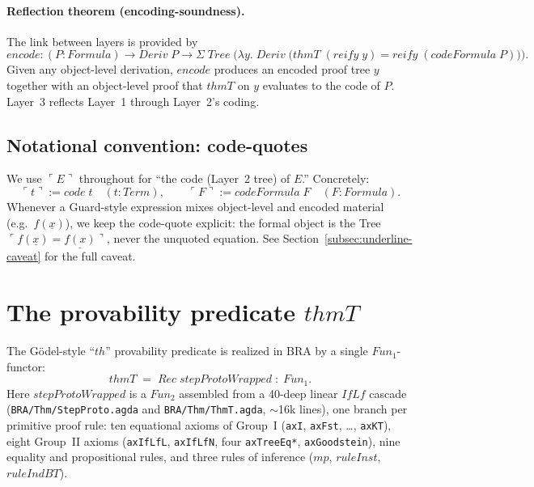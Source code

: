 \documentclass[11pt]{article}
\begin{document}
\paragraph{Reflection theorem (encoding-soundness).}
The link between layers is provided by
\[
  \mathit{encode} : (P : \mathit{Formula}) \to \mathit{Deriv}\;P \to
    \Sigma\;\mathit{Tree}\;\bigl(\lambda y.\;\mathit{Deriv}\;
      \bigl(\mathit{thmT}\;(\mathit{reify}\;y) =
            \mathit{reify}\;(\mathit{codeFormula}\;P)\bigr)\bigr).
\]
Given any object-level derivation, $\mathit{encode}$ produces an
encoded proof tree $y$ together with an object-level proof that
$\mathit{thmT}$ on $y$ evaluates to the code of $P$.  Layer~3 reflects
Layer~1 through Layer~2's coding.

\subsection{Notational convention: code-quotes}
\label{subsec:codequote}

We use $\ulcorner E \urcorner$ throughout for ``the code (Layer~2 tree) of
$E$.''  Concretely:
\[
  \ulcorner t \urcorner := \mathit{code}\;t \quad (t : \mathit{Term}), \qquad
  \ulcorner F \urcorner := \mathit{codeFormula}\;F \quad (F : \mathit{Formula}).
\]
Whenever a Guard-style expression mixes object-level and encoded
material (e.g.\ $f(\underline{x})$), we keep the code-quote explicit:
the formal object is the Tree $\ulcorner f(\underline{x}) =
\underline{f(x)}\urcorner$, never the unquoted equation.  See
Section~\ref{subsec:underline-caveat} for the full caveat.

\section{The provability predicate $\mathit{thmT}$}
\label{sec:thmT}

The G\"odel-style ``$\mathit{th}$'' provability predicate is realized in BRA by a single $\mathit{Fun}_1$-functor:
\[
  \mathit{thmT} \;=\; \mathit{Rec}\;\mathit{stepProtoWrapped} \;:\; \mathit{Fun}_1.
\]
Here $\mathit{stepProtoWrapped}$ is a $\mathit{Fun}_2$ assembled from a 40-deep linear $\mathit{IfLf}$ cascade
(\verb|BRA/Thm/StepProto.agda| and \verb|BRA/Thm/ThmT.agda|, $\sim$16k lines), one branch per primitive proof rule:
ten equational axioms of Group~I (\verb|axI|, \verb|axFst|, \dots, \verb|axKT|), eight Group~II axioms
(\verb|axIfLfL|, \verb|axIfLfN|, four \verb|axTreeEq*|, \verb|axGoodstein|), nine equality and propositional rules,
and three rules of inference ($\mathit{mp}$, $\mathit{ruleInst}$, $\mathit{ruleIndBT}$).
\end{document}
